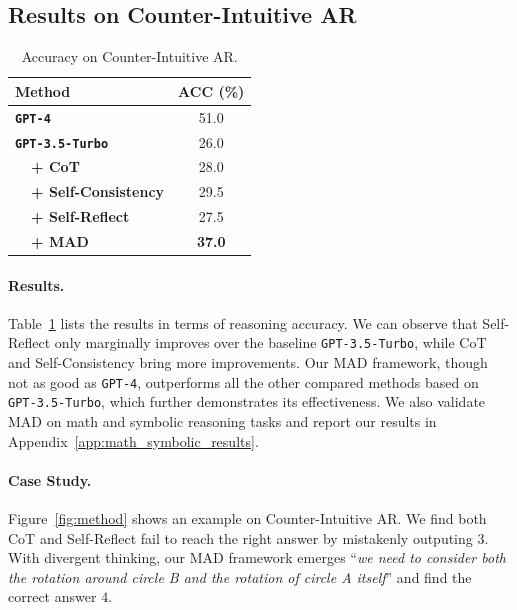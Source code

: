 \subsection{Results on Counter-Intuitive AR}
\label{subsec_ar}

\begin{table}[t!]
\centering
\begin{tabular}{l c}
\toprule
\bf Method  & \multicolumn{1}{c}{\bf ACC (\%)} \\
\midrule
\bf\texttt{GPT-4}         &  51.0 \\
\hline
\bf\texttt{GPT-3.5-Turbo} & 26.0 \\
\bf ~~+ CoT        & 28.0       \\
\bf ~~+ Self-Consistency      & 29.5   \\
\bf ~~+ Self-Reflect  &  27.5         \\ 
\hdashline
\bf ~~+ MAD               & \textbf{37.0} \\
\bottomrule
\end{tabular}
\vspace{-5pt}
\caption{Accuracy on Counter-Intuitive AR.}
\label{tab:CIAR}
\vspace{-10pt}
\end{table}

\paragraph{Results.} Table~\ref{tab:CIAR} lists the results in terms of reasoning accuracy.
We can observe that Self-Reflect only marginally improves over the baseline \texttt{GPT-3.5-Turbo}, while CoT and Self-Consistency bring more improvements.
Our MAD framework, though not as good as \texttt{GPT-4}, outperforms all the other compared methods based on \texttt{GPT-3.5-Turbo}, which further demonstrates its effectiveness. We also validate MAD on math and symbolic reasoning tasks and report our results in Appendix~\ref{app:math_symbolic_results}.

\paragraph{Case Study.} Figure~\ref{fig:method} shows an example on Counter-Intuitive AR. We find both CoT and Self-Reflect fail to reach the right answer by mistakenly outputing $3$. With divergent thinking, our MAD framework emerges ``\textit{we need to consider both the rotation around circle B and the rotation of circle A itself}'' and find the correct answer $4$.
